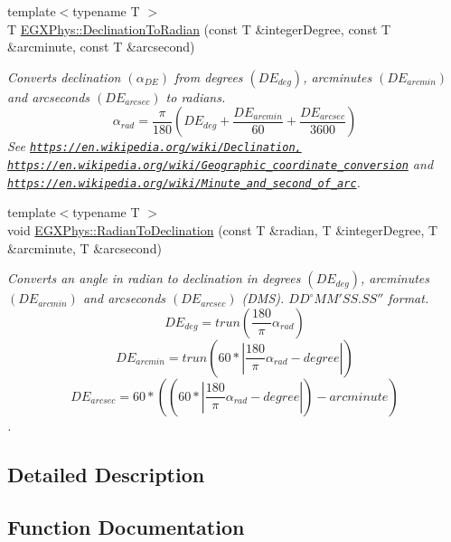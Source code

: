 \begin{DoxyCompactItemize}
{\footnotesize template$<$typename T $>$ }\\T \mbox{\hyperlink{group___e_g_x_phys-_astrophysics-_declination_ga9966c20d61a2f1846a338383f695c1e5}{E\+G\+X\+Phys\+::\+Declination\+To\+Radian}} (const T \&integer\+Degree, const T \&arcminute, const T \&arcsecond)
\begin{DoxyCompactList}\small\item\em Converts declination $(\alpha_{DE})$ from degrees $(DE_{deg})$, arcminutes $(DE_{arcmin})$ and arcseconds $(DE_{arcsec})$ to radians. \[\alpha_{rad}=\frac{\pi}{180}(DE_{deg} + \frac{DE_{arcmin}}{60} + \frac{DE_{arcsec}}{3600})\] See \href{https://en.wikipedia.org/wiki/Declination,}{\tt https\+://en.\+wikipedia.\+org/wiki/\+Declination,} \href{https://en.wikipedia.org/wiki/Geographic_coordinate_conversion}{\tt https\+://en.\+wikipedia.\+org/wiki/\+Geographic\+\_\+coordinate\+\_\+conversion} and \href{https://en.wikipedia.org/wiki/Minute_and_second_of_arc}{\tt https\+://en.\+wikipedia.\+org/wiki/\+Minute\+\_\+and\+\_\+second\+\_\+of\+\_\+arc}. \end{DoxyCompactList}\item 
{\footnotesize template$<$typename T $>$ }\\void \mbox{\hyperlink{group___e_g_x_phys-_astrophysics-_declination_gac0f1fab204ea5ae84b6723f857b89318}{E\+G\+X\+Phys\+::\+Radian\+To\+Declination}} (const T \&radian, T \&integer\+Degree, T \&arcminute, T \&arcsecond)
\begin{DoxyCompactList}\small\item\em Converts an angle in radian to declination in degrees $(DE_{deg})$, arcminutes $(DE_{arcmin})$ and arcseconds $(DE_{arcsec})$ (D\+MS). ${DD}^{\circ}{MM}'{SS.SS}''$ format. \[DE_{deg}=trun(\frac{180}{\pi}\alpha_{rad})\] \[DE_{arcmin}=trun(60 * |\frac{180}{\pi}\alpha_{rad} - degree|)\] \[DE_{arcsec}=60 * ((60 * |\frac{180}{\pi}\alpha_{rad} - degree|)-arcminute)\]. \end{DoxyCompactList}\end{DoxyCompactItemize}


\subsection{Detailed Description}


\subsection{Function Documentation}
\mbox{\label{group___e_g_x_phys-_astrophysics-_declination_ga6d607dacfbbdd0b1e0f18b746cabd712}} 
